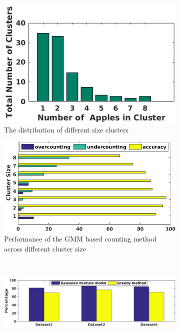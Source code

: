 \begin{figure}[tbp]
        \centering
        \begin{subfigure}[b]{.3\textwidth}
        \includegraphics[width=\textwidth]{figures/counting/countAnalysisData31.png}
        \caption{The distribution of different size clusters}
             \label{fig:segdata}
        \end{subfigure}\quad \begin{subfigure}[b]{.65\textwidth}
                 \includegraphics[width=\textwidth]{figures/counting/clusterAnalysis31.png} 
                 \caption{Performance of the GMM based counting method across different cluster size}
                     \label{fig:clusterAnlysis}   
        \end{subfigure}\\ \begin{subfigure}[b]{.9\textwidth}
                     \includegraphics[width = \textwidth]{figures/counting/redgreen31.png}   

\end{subfigure}
\end{figure}
